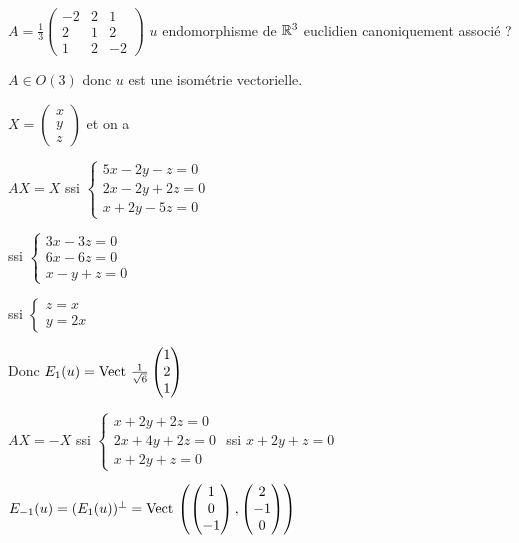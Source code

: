 \begin{exemple}
    $A = \frac 1 3 \begin{pmatrix}
        -2 & 2 & 1 \\
        2 & 1 & 2 \\
        1 & 2 & -2
    \end{pmatrix}$ $u$ endomorphisme de $\mathbb{R}^3$ euclidien canoniquement associé ? 

    $A \in O(3)$ donc $u$ est une isométrie vectorielle. 

    $X = \begin{pmatrix}
        x \\ y \\ z 
    \end{pmatrix}$ et on a 

    $AX = X$ ssi $\begin{cases}
        5x - 2y - z = 0 \\
        2x - 2y + 2z = 0 \\
        x + 2y - 5z = 0
    \end{cases}$ 

    ssi $\begin{cases}
        3x - 3z = 0 \\
        6x - 6z = 0 \\
        x - y + z = 0
    \end{cases}$

    ssi $\begin{cases}
        z = x \\
        y = 2x 
    \end{cases}$

    Donc $E_1(u) = \operatorname{Vect} \, \frac 1 {\sqrt 6} \begin{pmatrix}
        1 \\ 2 \\ 1
    \end{pmatrix}$

    $AX = - X$ ssi $\begin{cases}
        x + 2y + 2z = 0 \\
        2x + 4y + 2z = 0 \\
        x + 2y + z = 0
    \end{cases}$ ssi $x + 2y + z = 0$

    $E_{-1}(u) = (E_1(u))^\perp = \operatorname{Vect} \, \left( \begin{pmatrix}
        1 \\ 0 \\ - 1
    \end{pmatrix}, \begin{pmatrix}
        2 \\ -1 \\ 0
    \end{pmatrix} \right)$


\end{exemple}
